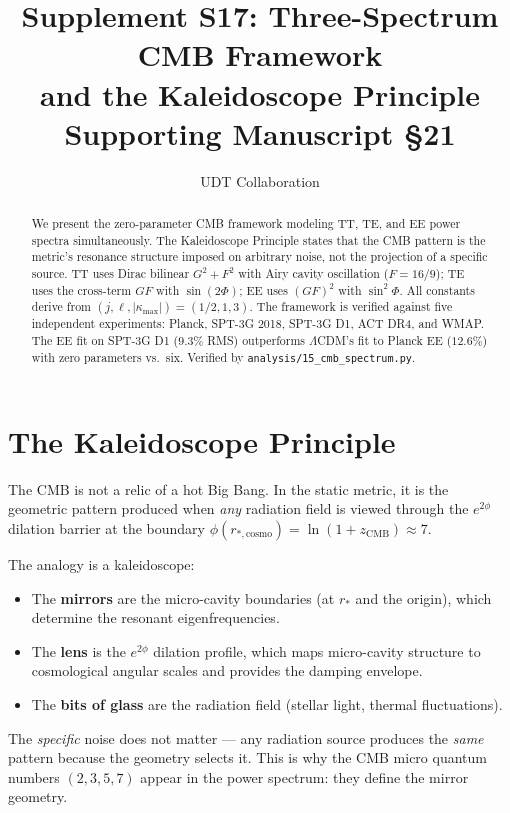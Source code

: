 \documentclass[11pt,letterpaper]{article}
\title{Supplement S17: Three-Spectrum CMB Framework \\
and the Kaleidoscope Principle \\
\large Supporting Manuscript \S21}
\author{UDT Collaboration}
\date{}
\numberwithin{equation}{section}
\begin{document}
\maketitle

\begin{abstract}
We present the zero-parameter CMB framework modeling TT, TE, and EE
power spectra simultaneously.  The Kaleidoscope Principle states that
the CMB pattern is the metric's resonance structure imposed on
arbitrary noise, not the projection of a specific source.  TT uses
Dirac bilinear $G^2 + F^2$ with Airy cavity oscillation ($F = 16/9$);
TE uses the cross-term $GF$ with $\sin(2\Phi)$; EE uses $(GF)^2$ with
$\sin^2\Phi$.  All constants derive from
$(j, \ell, |\kappa_\mathrm{max}|) = (1/2, 1, 3)$.  The framework is
verified against five independent experiments: Planck, SPT-3G 2018,
SPT-3G D1, ACT DR4, and WMAP.  The EE fit on SPT-3G D1 ($9.3\%$ RMS)
outperforms $\Lambda$CDM's fit to Planck EE ($12.6\%$) with zero
parameters vs.\ six.  Verified by \texttt{analysis/15\_cmb\_spectrum.py}.
\end{abstract}

\tableofcontents

\section{The Kaleidoscope Principle}
\label{sec:kaleidoscope}

The CMB is not a relic of a hot Big Bang.  In the static metric, it is
the geometric pattern produced when \emph{any} radiation field is
viewed through the $e^{2\phi}$ dilation barrier at the boundary
$\phi(r_{*,\mathrm{cosmo}}) = \ln(1 + z_\mathrm{CMB}) \approx 7$.

The analogy is a kaleidoscope:
\begin{itemize}
  \item The \textbf{mirrors} are the micro-cavity boundaries
    (at $r_*$ and the origin), which determine the resonant
    eigenfrequencies.
  \item The \textbf{lens} is the $e^{2\phi}$ dilation profile, which
    maps micro-cavity structure to cosmological angular scales and
    provides the damping envelope.
  \item The \textbf{bits of glass} are the radiation field (stellar
    light, thermal fluctuations).
\end{itemize}
The \emph{specific} noise does not matter --- any radiation source
produces the \emph{same} pattern because the geometry selects it.
This is why the CMB micro quantum numbers $(2, 3, 5, 7)$ appear in the
power spectrum: they define the mirror geometry.
\end{document}
